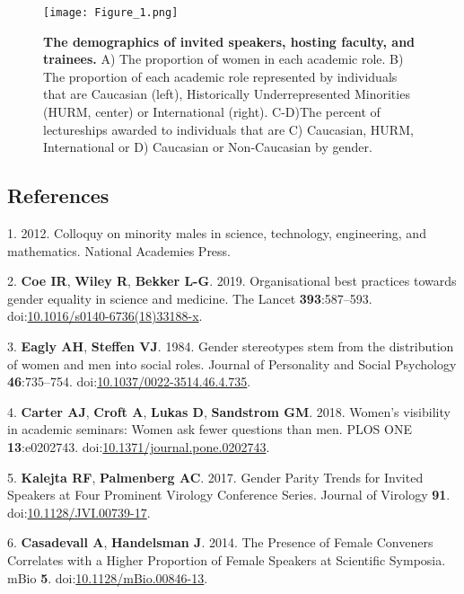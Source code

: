 \documentclass[10pt,]{article}
\begin{document}
\begin{figure}
\centering
\texttt{[image: Figure\_1.png]}
\caption{\textbf{The demographics of invited speakers, hosting faculty,
and trainees.} A) The proportion of women in each academic role. B) The
proportion of each academic role represented by individuals that are
Caucasian (left), Historically Underrepresented Minorities (HURM,
center) or International (right). C-D)The percent of lectureships
awarded to individuals that are C) Caucasian, HURM, International or D)
Caucasian or Non-Caucasian by gender.}
\end{figure}

\newpage

\subsection{References}\label{references}

\hypertarget{refs}{}
\hypertarget{ref-colloquy_2012}{}
1. 2012. Colloquy on minority males in science, technology, engineering,
and mathematics. National Academies Press.

\hypertarget{ref-Coe2019}{}
2. \textbf{Coe IR}, \textbf{Wiley R}, \textbf{Bekker L-G}. 2019.
Organisational best practices towards gender equality in science and
medicine. The Lancet \textbf{393}:587--593.
doi:\href{https://doi.org/10.1016/s0140-6736(18)33188-x}{10.1016/s0140-6736(18)33188-x}.

\hypertarget{ref-Eagly1984}{}
3. \textbf{Eagly AH}, \textbf{Steffen VJ}. 1984. Gender stereotypes stem
from the distribution of women and men into social roles. Journal of
Personality and Social Psychology \textbf{46}:735--754.
doi:\href{https://doi.org/10.1037/0022-3514.46.4.735}{10.1037/0022-3514.46.4.735}.

\hypertarget{ref-Carter2018}{}
4. \textbf{Carter AJ}, \textbf{Croft A}, \textbf{Lukas D},
\textbf{Sandstrom GM}. 2018. Women's visibility in academic seminars:
Women ask fewer questions than men. PLOS ONE \textbf{13}:e0202743.
doi:\href{https://doi.org/10.1371/journal.pone.0202743}{10.1371/journal.pone.0202743}.

\hypertarget{ref-kalejta_gender_2017}{}
5. \textbf{Kalejta RF}, \textbf{Palmenberg AC}. 2017. Gender Parity
Trends for Invited Speakers at Four Prominent Virology Conference
Series. Journal of Virology \textbf{91}.
doi:\href{https://doi.org/10.1128/JVI.00739-17}{10.1128/JVI.00739-17}.

\hypertarget{ref-casadevall_presence_2014}{}
6. \textbf{Casadevall A}, \textbf{Handelsman J}. 2014. The Presence of
Female Conveners Correlates with a Higher Proportion of Female Speakers
at Scientific Symposia. mBio \textbf{5}.
doi:\href{https://doi.org/10.1128/mBio.00846-13}{10.1128/mBio.00846-13}.
\end{document}
